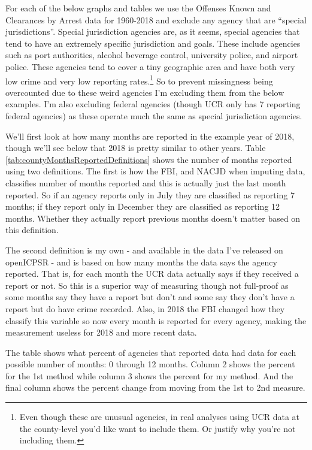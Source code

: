 \documentclass[
  12pt,
  openany]{book}
\begin{document}
For each of the below graphs and tables we use the Offenses Known and Clearances by Arrest data for 1960-2018 and exclude any agency that are ``special jurisdictions''. Special jurisdiction agencies are, as it seems, special agencies that tend to have an extremely specific jurisdiction and goals. These include agencies such as port authorities, alcohol beverage control, university police, and airport police. These agencies tend to cover a tiny geographic area and have both very low crime and very low reporting rates.\footnote{Even though these are unusual agencies, in real analyses using UCR data at the county-level you'd like want to include them. Or justify why you're not including them.} So to prevent missingness being overcounted due to these weird agencies I'm excluding them from the below examples. I'm also excluding federal agencies (though UCR only has 7 reporting federal agencies) as these operate much the same as special jurisdiction agencies.

We'll first look at how many months are reported in the example year of 2018, though we'll see below that 2018 is pretty similar to other years. Table \ref{tab:countyMonthsReportedDefinitions} shows the number of months reported using two definitions. The first is how the FBI, and NACJD when imputing data, classifies number of months reported and this is actually just the last month reported. So if an agency reports only in July they are classified as reporting 7 months; if they report only in December they are classified as reporting 12 months. Whether they actually report previous months doesn't matter based on this definition.

The second definition is my own - and available in the data I've released on openICPSR - and is based on how many months the data says the agency reported. That is, for each month the UCR data actually says if they received a report or not. So this is a superior way of measuring though not full-proof as some months say they have a report but don't and some say they don't have a report but do have crime recorded. Also, in 2018 the FBI changed how they classify this variable so now every month is reported for every agency, making the measurement useless for 2018 and more recent data.

The table shows what percent of agencies that reported data had data for each possible number of months: 0 through 12 months. Column 2 shows the percent for the 1st method while column 3 shows the percent for my method. And the final column shows the percent change from moving from the 1st to 2nd measure.
\end{document}
